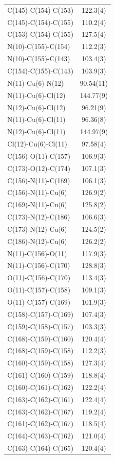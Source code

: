 \begin{center}
{\begin{supertabular}{p{1.5in}c}
C(145)-C(154)-C(153)&122.3(4)\\
C(145)-C(154)-C(155)&110.2(4)\\
C(153)-C(154)-C(155)&127.5(4)\\
N(10)-C(155)-C(154)&112.2(3)\\
N(10)-C(155)-C(143)&103.4(3)\\
C(154)-C(155)-C(143)&103.9(3)\\
N(11)-Cu(6)-N(12)&90.54(11)\\
N(11)-Cu(6)-Cl(12)&144.77(9)\\
N(12)-Cu(6)-Cl(12)&96.21(9)\\
N(11)-Cu(6)-Cl(11)&96.36(8)\\
N(12)-Cu(6)-Cl(11)&144.97(9)\\
Cl(12)-Cu(6)-Cl(11)&97.58(4)\\
C(156)-O(11)-C(157)&106.9(3)\\
C(173)-O(12)-C(174)&107.1(3)\\
C(156)-N(11)-C(169)&106.1(3)\\
C(156)-N(11)-Cu(6)&126.9(2)\\
C(169)-N(11)-Cu(6)&125.8(2)\\
C(173)-N(12)-C(186)&106.6(3)\\
C(173)-N(12)-Cu(6)&124.5(2)\\
C(186)-N(12)-Cu(6)&126.2(2)\\
N(11)-C(156)-O(11)&117.9(3)\\
N(11)-C(156)-C(170)&128.8(3)\\
O(11)-C(156)-C(170)&113.4(3)\\
O(11)-C(157)-C(158)&109.1(3)\\
O(11)-C(157)-C(169)&101.9(3)\\
C(158)-C(157)-C(169)&107.4(3)\\
C(159)-C(158)-C(157)&103.3(3)\\
C(168)-C(159)-C(160)&120.4(4)\\
C(168)-C(159)-C(158)&112.2(3)\\
C(160)-C(159)-C(158)&127.3(4)\\
C(161)-C(160)-C(159)&118.8(4)\\
C(160)-C(161)-C(162)&122.2(4)\\
C(163)-C(162)-C(161)&122.4(4)\\
C(163)-C(162)-C(167)&119.2(4)\\
C(161)-C(162)-C(167)&118.5(4)\\
C(164)-C(163)-C(162)&121.0(4)\\
C(163)-C(164)-C(165)&120.4(4)\\

\end{supertabular}}
\end{center}
